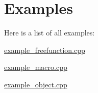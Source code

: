 \section{Examples}
Here is a list of all examples\+:\begin{DoxyCompactItemize}
\item 
\hyperlink{example_freefunction_8cpp-example}{example\+\_\+freefunction.\+cpp}
\item 
\hyperlink{example_macro_8cpp-example}{example\+\_\+macro.\+cpp}
\item 
\hyperlink{example_object_8cpp-example}{example\+\_\+object.\+cpp}
\end{DoxyCompactItemize}
